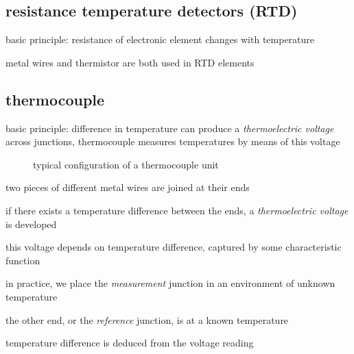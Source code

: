 \subsection*{resistance temperature detectors (RTD)}

basic principle: resistance of electronic element changes with temperature

metal wires and thermistor are both used in RTD elements 


\subsection*{thermocouple}

basic principle: difference in temperature can produce a \emph{thermoelectric voltage} across junctions, thermocouple measures temperatures by means of this voltage

\begin{figure}[ht]
	\centering
	
	\caption*{typical configuration of a thermocouple unit}
\end{figure}

two pieces of different metal wires are joined at their ends

if there exists a temperature difference between the ends, a \emph{thermoelectric voltage} is developed

this voltage depends on temperature difference, captured by some characteristic function

in practice, we place the \emph{measurement} junction in an environment of unknown temperature

the other end, or the \emph{reference} junction, is at a known temperature

temperature difference is deduced from the voltage reading

